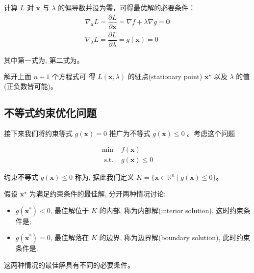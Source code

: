 \begin{theorem}[拉格朗日乘子法最优解必要条件]
    计算 $ L $ 对 $ \mathbf{x} $ 与 $ \lambda $ 的偏导数并设为零，可得最优解的必要条件：
$$
\begin{array}{l}
\nabla_{\mathbf{x}} L=\dfrac{\partial L}{\partial \mathbf{x}}=\nabla f+\lambda \nabla g=\mathbf{0} \\
\nabla_{\lambda} L=\dfrac{\partial L}{\partial \lambda}=g(\mathbf{x})=0
\end{array}
$$

其中第一式为, 第二式为。
\end{theorem}


解开上面 $ n+1 $ 个方程式可 得 $ L(\mathbf{x}, \lambda) $ 的驻点(stationary point) $ \mathbf{x}^{\star} $ 以及 $ \lambda $ 的值(正负数皆可能)。

\subsection{不等式约束优化问题}

接下来我们将约束等式 $ g(\mathbf{x})=0 $ 推广为不等式 $ g(\mathbf{x}) \leq 0 $ 。考虑这个问题

\begin{problem}[不等式约束优化问题]

$$
\begin{array}{ll}
\min & f(\mathbf{x}) \\
\text { s.t. } & g(\mathbf{x}) \leq 0
\end{array}
$$

约束不等式 $ g(\mathbf{x}) \leq 0 $ 称为, 据此我们定义 $ K=\{ \mathbf{x} \in \mathbb{R}^{n} \mid g(\mathbf{x}) \leq 0 \}$。
\end{problem}

假设 $ \mathbf{x}^{\star} $ 为满足约束条件的最佳解, 分开两种情况讨论:

\begin{itemize}
    \item $ g\left(\mathbf{x}^{*}\right)<0 $, 最佳解位于 $ K $ 的内部, 称为内部解(interior solution), 这时约束条件是;
    \item $ g\left(\mathbf{x}^{*}\right)=0 $, 最佳解落在 $ K $ 的边界, 称为边界解(boundary solution), 此时约束条件是.
\end{itemize}

这两种情况的最佳解具有不同的必要条件。

